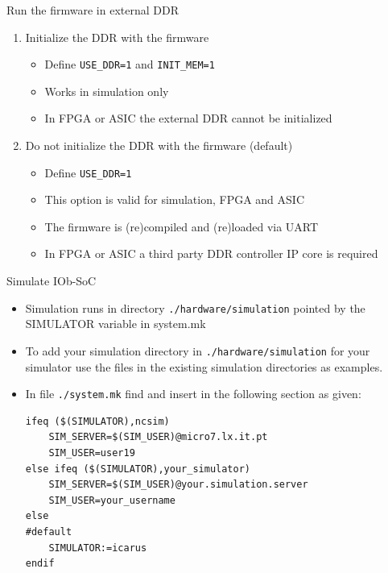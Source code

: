 \documentclass [xcolor=svgnames, t] {beamer}
\begin{document}
\begin{frame}{Run the firmware in external DDR}
\begin{enumerate}
\item Initialize the DDR with the firmware
  \begin{itemize}
  \item Define {\tt USE\_DDR=1} and {\tt INIT\_MEM=1}
  \item Works in simulation only
  \item In FPGA or ASIC the external DDR cannot be initialized
  \end{itemize}
\item Do not initialize the DDR with the firmware (default)
  \begin{itemize}
  \item Define {\tt USE\_DDR=1}
  \item This option is valid for simulation, FPGA and ASIC
  \item The firmware is (re)compiled and (re)loaded via UART
  \item In FPGA or ASIC a third party DDR controller IP core is required
  \end{itemize}
\end{enumerate}
\end{frame}


\begin{frame}[fragile]{Simulate IOb-SoC}
  \begin{itemize}
  \item Simulation runs in directory {\tt ./hardware/simulation} pointed by the
    SIMULATOR variable in system.mk
  \item To add your simulation directory in {\tt ./hardware/simulation} for your
    simulator use the files in the existing simulation directories as examples.
  \item In file {\tt ./system.mk} find and insert in the following section as given:
    \begin{lstlisting}
ifeq ($(SIMULATOR),ncsim)
	SIM_SERVER=$(SIM_USER)@micro7.lx.it.pt
	SIM_USER=user19
else ifeq ($(SIMULATOR),your_simulator)
	SIM_SERVER=$(SIM_USER)@your.simulation.server
	SIM_USER=your_username
else
#default
	SIMULATOR:=icarus
endif
    \end{lstlisting}
  \end{itemize}
\end{frame}
\end{document}
